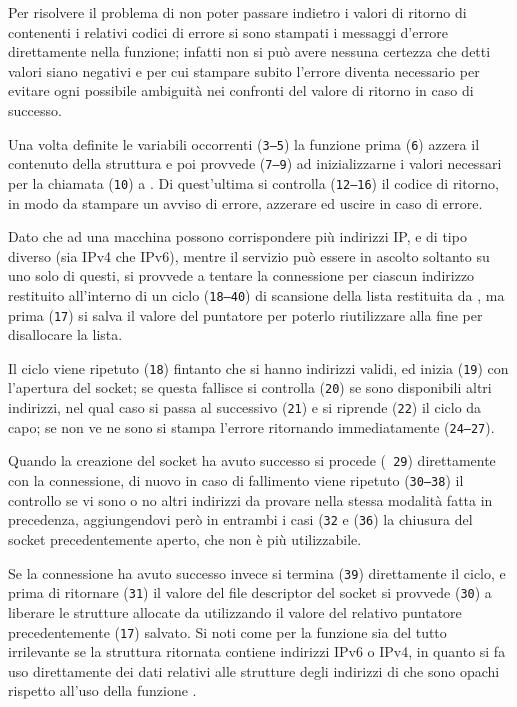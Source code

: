 Per risolvere il problema di non poter passare indietro i valori di ritorno di
 contenenti i relativi codici di errore si sono stampati i
messaggi d'errore direttamente nella funzione; infatti non si può avere
nessuna certezza che detti valori siano negativi e per cui stampare subito
l'errore diventa necessario per evitare ogni possibile ambiguità nei confronti
del valore di ritorno in caso di successo.

Una volta definite le variabili occorrenti (\texttt{\small 3--5}) la funzione
prima (\texttt{\small 6}) azzera il contenuto della struttura  e poi
provvede (\texttt{\small 7--9}) ad inizializzarne i valori necessari per la
chiamata (\texttt{\small 10}) a . Di quest'ultima si
controlla (\texttt{\small 12--16}) il codice di ritorno, in modo da stampare
un avviso di errore, azzerare  ed uscire in caso di errore.  

Dato che ad una macchina possono corrispondere più indirizzi IP, e di tipo
diverso (sia IPv4 che IPv6), mentre il servizio può essere in ascolto soltanto
su uno solo di questi, si provvede a tentare la connessione per ciascun
indirizzo restituito all'interno di un ciclo (\texttt{\small 18--40}) di
scansione della lista restituita da , ma prima
(\texttt{\small 17}) si salva il valore del puntatore per poterlo riutilizzare
alla fine per disallocare la lista.

Il ciclo viene ripetuto (\texttt{\small 18}) fintanto che si hanno indirizzi
validi, ed inizia (\texttt{\small 19}) con l'apertura del socket; se questa
fallisce si controlla (\texttt{\small 20}) se sono disponibili altri
indirizzi, nel qual caso si passa al successivo (\texttt{\small 21}) e si
riprende (\texttt{\small 22}) il ciclo da capo; se non ve ne sono si stampa
l'errore ritornando immediatamente (\texttt{\small 24--27}). 

Quando la creazione del socket ha avuto successo si procede (\texttt{\small
  29}) direttamente con la connessione, di nuovo in caso di fallimento viene
ripetuto (\texttt{\small 30--38}) il controllo se vi sono o no altri indirizzi
da provare nella stessa modalità fatta in precedenza, aggiungendovi però in
entrambi i casi (\texttt{\small 32} e (\texttt{\small 36}) la chiusura del
socket precedentemente aperto, che non è più utilizzabile.

Se la connessione ha avuto successo invece si termina (\texttt{\small 39})
direttamente il ciclo, e prima di ritornare (\texttt{\small 31}) il valore del
file descriptor del socket si provvede (\texttt{\small 30}) a liberare le
strutture  allocate da  utilizzando il
valore del relativo puntatore precedentemente (\texttt{\small 17}) salvato.
Si noti come per la funzione sia del tutto irrilevante se la struttura
ritornata contiene indirizzi IPv6 o IPv4, in quanto si fa uso direttamente dei
dati relativi alle strutture degli indirizzi di  che sono
opachi rispetto all'uso della funzione .

